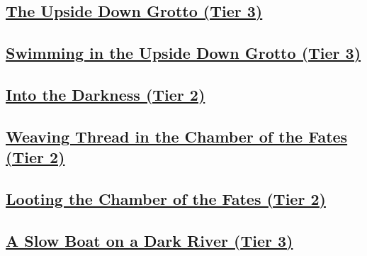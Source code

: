 \documentclass[sheet]{GL2020}
\begin{document}
\clearpage

\begin{center}\section*{\underline{The Upside Down Grotto (Tier 3)}}\end{center}
\label{UpsideDownGrotto}

\clearpage


\begin{center}\section*{\underline{Swimming in the Upside Down Grotto (Tier 3)}}\end{center}
\label{SwiminGrotto}

\clearpage

\begin{center}\section*{\underline{Into the Darkness (Tier 2)}}\end{center}
\label{IntotheDarkness}

\clearpage


\begin{center}\section*{\underline{Weaving Thread in the Chamber of the Fates (Tier 2)}}\end{center}
\label{WeavingThreadChamberofFates}

\clearpage

\begin{center}\section*{\underline{Looting the Chamber of the Fates (Tier 2)}}\end{center}
\label{LootingChamberofFates}

\clearpage

\begin{center}\section*{\underline{A Slow Boat on a Dark River (Tier 3)}}\end{center}
\label{SlowBoatDarkRiver}
\end{document}
